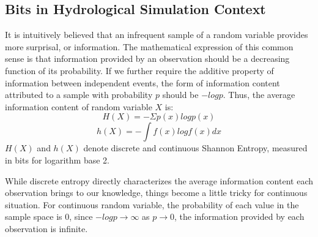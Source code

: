 \documentclass[draft,wrr]{AGUTeX}
\begin{document}
\begin{article}
\subsection{Bits in Hydrological Simulation Context}
It is intuitively believed that an infrequent sample of a random variable provides more surprisal, or information. The  mathematical expression of this common sense is that information provided by an observation should be a decreasing function of its probability. If we further require the additive property of information between independent events, the form of information content attributed to a sample with probability $p$ should be $-logp$. Thus, the average information content of random variable $X$ is:
\begin{equation}
\label{dentropy}
H(X)=-\Sigma p(x)logp(x)
\end{equation}
\begin{equation}
\label{centropy}
h(X)=-\int f(x)logf(x)dx
\end{equation}   
$H(X)$ and $h(X)$ denote discrete and continuous Shannon Entropy, measured in bits for logarithm base 2. %

While discrete entropy directly characterizes the average information content each observation brings to our knowledge, things become a little tricky for continuous situation. For continuous random variable, the probability of each value in the sample space is 0, since $-logp \to \infty$  as $p \to 0$, the information provided by each observation is infinite.  


\end{article}
\end{document}

